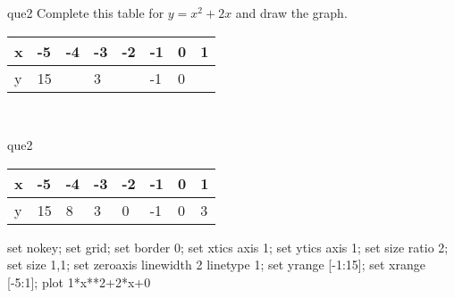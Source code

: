 \documentclass[13.5pt, varwidth=true]{beamer}
\begin{document}
\begin{frame}[shrink=19,fragile]
	\begin{beamercolorbox}[rounded=true, left, shadow=true,wd=14.8cm]{que2}
		 Complete this table for $y = x^{2} + 2x$ and draw the graph. \\[0.3cm] \renewcommand{\arraystretch}{1.2}\begin{tabular}{|C|C|C|C|C|C|C|C|} \hline x & -5 & -4 & -3 & -2 & -1 & 0 & 1 \\ \hline y & 15 &  & 3 &  & -1 & 0 & \\ \hline \end{tabular}\\[0.3cm]
	\end{beamercolorbox}
\end{frame}
\begin{frame}[shrink=19,fragile]
	\begin{beamercolorbox}[rounded=true, left, shadow=true,wd=14.8cm]{que2}
		\renewcommand{\arraystretch}{1.2}\begin{tabular}{|C|C|C|C|C|C|C|C|} \hline x & -5 & -4 & -3 & -2 & -1 & 0 & 1 \\ \hline y & 15 & 8 & 3 & 0 & -1 & 0 & 3\\ \hline \end{tabular}\begin{gnuplot}[terminal=pdf] set nokey; set grid; set border 0; set xtics axis 1; set ytics axis 1; set size ratio 2; set size 1,1; set zeroaxis linewidth 2 linetype 1; set yrange [-1:15]; set xrange [-5:1]; plot 1*x**2+2*x+0 \end{gnuplot}
	\end{beamercolorbox}
\end{frame}
\end{document}
